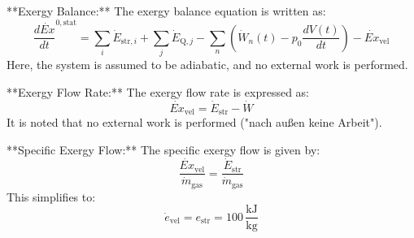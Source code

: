 **Exergy Balance:**  
The exergy balance equation is written as:  
\[
\frac{d\dot{Ex}}{dt}^{0, \text{stat}} = \sum_i \dot{E}_{\text{str},i} + \sum_j \dot{E}_{\text{Q},j} - \sum_n \left( \dot{W}_n(t) - p_0 \frac{dV(t)}{dt} \right) - \dot{Ex}_{\text{vel}}
\]  
Here, the system is assumed to be adiabatic, and no external work is performed.

**Exergy Flow Rate:**  
The exergy flow rate is expressed as:  
\[
\dot{Ex}_{\text{vel}} = \dot{E}_{\text{str}} - \dot{W}
\]  
It is noted that no external work is performed ("nach außen keine Arbeit").

**Specific Exergy Flow:**  
The specific exergy flow is given by:  
\[
\frac{\dot{Ex}_{\text{vel}}}{\dot{m}_{\text{gas}}} = \frac{\dot{E}_{\text{str}}}{\dot{m}_{\text{gas}}}
\]  
This simplifies to:  
\[
\dot{e}_{\text{vel}} = e_{\text{str}} = 100 \, \frac{\text{kJ}}{\text{kg}}
\]